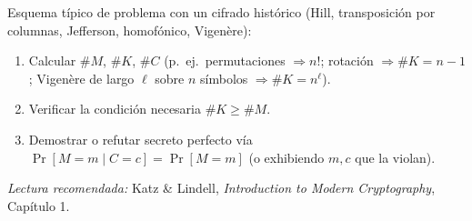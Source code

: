 \documentclass[../main.tex]{subfiles}
\begin{document}
\begin{examen}
Esquema típico de problema con un cifrado histórico (Hill, transposición por
columnas, Jefferson, homofónico, Vigenère):
\begin{enumerate}[nosep]
  \item Calcular $\#M$, $\#K$, $\#C$ (p.\ ej.\ permutaciones $\Rightarrow n!$;
        rotación $\Rightarrow \#K = n-1$; Vigenère de largo $\ell$ sobre $n$
        símbolos $\Rightarrow \#K = n^{\ell}$).
  \item Verificar la condición necesaria $\#K \ge \#M$.
  \item Demostrar o refutar secreto perfecto vía
        $\Pr[M=m\mid C=c]=\Pr[M=m]$ (o exhibiendo $m,c$ que la violan).
\end{enumerate}
\end{examen}

\medskip
\noindent\textit{Lectura recomendada:} Katz \& Lindell, \emph{Introduction to
Modern Cryptography}, Capítulo 1.
\end{document}
